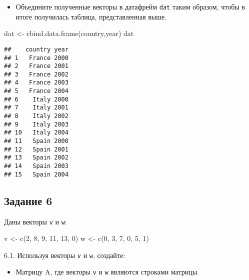 \documentclass[
]{article}
\newenvironment{Shaded}{\begin{snugshade}}{\end{snugshade}}
\newcommand{\DecValTok}[1]{\textcolor[rgb]{0.00,0.00,0.81}{#1}}
\newcommand{\FunctionTok}[1]{\textcolor[rgb]{0.00,0.00,0.00}{#1}}
\newcommand{\NormalTok}[1]{#1}
\newcommand{\OtherTok}[1]{\textcolor[rgb]{0.56,0.35,0.01}{#1}}
\providecommand{\tightlist}{%
  \setlength{\itemsep}{0pt}\setlength{\parskip}{0pt}}
\begin{document}
\begin{itemize}
\tightlist
\item
  Объедините полученные векторы в датафрейм \texttt{dat} таким образом,
  чтобы в итоге получилась таблица, представленная выше.
\end{itemize}

\begin{Shaded}
\begin{Highlighting}[]
\NormalTok{dat }\OtherTok{\textless{}{-}} \FunctionTok{cbind.data.frame}\NormalTok{(country,year)}
\NormalTok{dat}
\end{Highlighting}
\end{Shaded}

\begin{verbatim}
##    country year
## 1   France 2000
## 2   France 2001
## 3   France 2002
## 4   France 2003
## 5   France 2004
## 6    Italy 2000
## 7    Italy 2001
## 8    Italy 2002
## 9    Italy 2003
## 10   Italy 2004
## 11   Spain 2000
## 12   Spain 2001
## 13   Spain 2002
## 14   Spain 2003
## 15   Spain 2004
\end{verbatim}

\hypertarget{ux437ux430ux434ux430ux43dux438ux435-6}{%
\subsection{Задание 6}\label{ux437ux430ux434ux430ux43dux438ux435-6}}

Даны векторы \texttt{v} и \texttt{w}:

\begin{Shaded}
\begin{Highlighting}[]
\NormalTok{v }\OtherTok{\textless{}{-}} \FunctionTok{c}\NormalTok{(}\DecValTok{2}\NormalTok{, }\DecValTok{8}\NormalTok{, }\DecValTok{9}\NormalTok{, }\DecValTok{11}\NormalTok{, }\DecValTok{13}\NormalTok{, }\DecValTok{0}\NormalTok{)}
\NormalTok{w }\OtherTok{\textless{}{-}} \FunctionTok{c}\NormalTok{(}\DecValTok{0}\NormalTok{, }\DecValTok{3}\NormalTok{, }\DecValTok{7}\NormalTok{, }\DecValTok{0}\NormalTok{, }\DecValTok{5}\NormalTok{, }\DecValTok{1}\NormalTok{)}
\end{Highlighting}
\end{Shaded}

6.1. Используя векторы \texttt{v} и \texttt{w}, создайте:

\begin{itemize}
\tightlist
\item
  Матрицу A, где векторы \texttt{v} и \texttt{w} являются строками
  матрицы.
\end{itemize}
\end{document}

